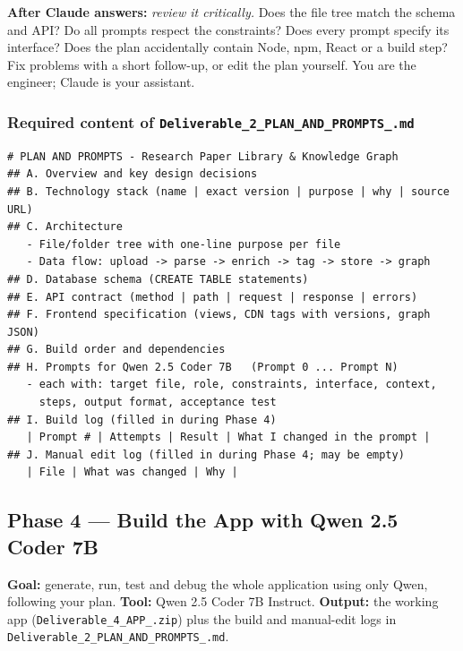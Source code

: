\documentclass[11pt,a4paper]{article}
\newcommand{\uid}{[HeUserID]}
\newcommand{\dB}{\texttt{Deliverable\_2\_\allowbreak PLAN\_AND\_PROMPTS\_\allowbreak\uid.md}}
\newcommand{\dD}{\texttt{Deliverable\_4\_\allowbreak APP\_\allowbreak\uid.zip}}
\begin{document}
\textbf{After Claude answers:} \emph{review it critically.} Does the file tree match the schema and API? Do all prompts respect the constraints? Does every prompt specify its interface? Does the plan accidentally contain Node, npm, React or a build step? Fix problems with a short follow-up, or edit the plan yourself. You are the engineer; Claude is your assistant.

\subsubsection{Required content of \dB}
\begin{lstlisting}
# PLAN AND PROMPTS - Research Paper Library & Knowledge Graph
## A. Overview and key design decisions
## B. Technology stack (name | exact version | purpose | why | source URL)
## C. Architecture
   - File/folder tree with one-line purpose per file
   - Data flow: upload -> parse -> enrich -> tag -> store -> graph
## D. Database schema (CREATE TABLE statements)
## E. API contract (method | path | request | response | errors)
## F. Frontend specification (views, CDN tags with versions, graph JSON)
## G. Build order and dependencies
## H. Prompts for Qwen 2.5 Coder 7B   (Prompt 0 ... Prompt N)
   - each with: target file, role, constraints, interface, context,
     steps, output format, acceptance test
## I. Build log (filled in during Phase 4)
   | Prompt # | Attempts | Result | What I changed in the prompt |
## J. Manual edit log (filled in during Phase 4; may be empty)
   | File | What was changed | Why |
\end{lstlisting}

\subsection{Phase 4 --- Build the App with Qwen 2.5 Coder 7B}
\label{sec:phase4}
\textbf{Goal:} generate, run, test and debug the whole application using only Qwen, following your plan. \textbf{Tool:} Qwen 2.5 Coder 7B Instruct. \textbf{Output:} the working app (\dD) plus the build and manual-edit logs in \dB.
\end{document}
